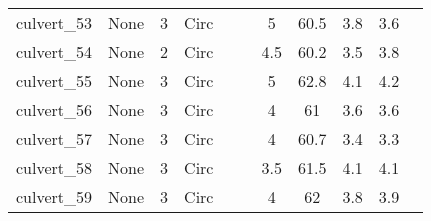 \begin{table}[]
\begin{tabular}{@{}lcccccccccc@{}}
culvert\_53   & None       & 3        & Circ &        &       & 5        & 60.5   & 3.8       & 3.6        \\
culvert\_54   & None       & 2        & Circ &        &       & 4.5      & 60.2   & 3.5       & 3.8        \\
culvert\_55   & None       & 3        & Circ &        &       & 5        & 62.8   & 4.1       & 4.2        \\
culvert\_56   & None       & 3        & Circ &        &       & 4        & 61     & 3.6       & 3.6        \\
culvert\_57   & None       & 3        & Circ &        &       & 4        & 60.7   & 3.4       & 3.3        \\
culvert\_58   & None       & 3        & Circ &        &       & 3.5      & 61.5   & 4.1       & 4.1        \\
culvert\_59   & None       & 3        & Circ &        &       & 4        & 62     & 3.8       & 3.9        \\
\bottomrule
\end{tabular}
\end{table}
\clearpage

